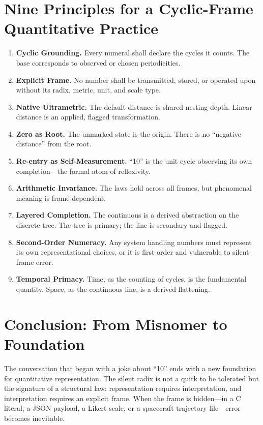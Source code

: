 \documentclass[12pt,a4paper]{article}
\theoremstyle{definition}
\theoremstyle{remark}
\begin{document}
\section{Nine Principles for a Cyclic-Frame Quantitative Practice}

\begin{enumerate}[nosep]
    \item \textbf{Cyclic Grounding.} Every numeral shall declare the cycles it counts. The base corresponds to observed or chosen periodicities.
    \item \textbf{Explicit Frame.} No number shall be transmitted, stored, or operated upon without its radix, metric, unit, and scale type.
    \item \textbf{Native Ultrametric.} The default distance is shared nesting depth. Linear distance is an applied, flagged transformation.
    \item \textbf{Zero as Root.} The unmarked state is the origin. There is no ``negative distance'' from the root.
    \item \textbf{Re-entry as Self-Measurement.} ``10'' is the unit cycle observing its own completion---the formal atom of reflexivity.
    \item \textbf{Arithmetic Invariance.} The laws hold across all frames, but phenomenal meaning is frame-dependent.
    \item \textbf{Layered Completion.} The continuous is a derived abstraction on the discrete tree. The tree is primary; the line is secondary and flagged.
    \item \textbf{Second-Order Numeracy.} Any system handling numbers must represent its own representational choices, or it is first-order and vulnerable to silent-frame error.
    \item \textbf{Temporal Primacy.} Time, as the counting of cycles, is the fundamental quantity. Space, as the continuous line, is a derived flattening.
\end{enumerate}

\section{Conclusion: From Misnomer to Foundation}

The conversation that began with a joke about ``10'' ends with a new foundation for quantitative representation. The silent radix is not a quirk to be tolerated but the signature of a structural law: representation requires interpretation, and interpretation requires an explicit frame. When the frame is hidden---in a C literal, a JSON payload, a Likert scale, or a spacecraft trajectory file---error becomes inevitable.
\end{document}
